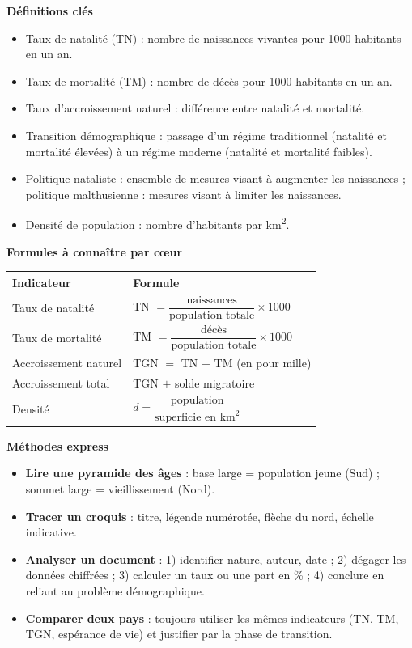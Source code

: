 \documentclass[11pt]{article}
\newcommand{\cle}[1]{{\popxbold\color{popdark}#1}}
\begin{document}
\begin{bilan}
\textbf{Définitions clés}
\begin{itemize}
  \item \cle{Taux de natalité} (TN) : nombre de naissances vivantes pour 1000 habitants en un an.
  \item \cle{Taux de mortalité} (TM) : nombre de décès pour 1000 habitants en un an.
  \item \cle{Taux d'accroissement naturel} : différence entre natalité et mortalité.
  \item \cle{Transition démographique} : passage d'un régime traditionnel (natalité et mortalité élevées) à un régime moderne (natalité et mortalité faibles).
  \item \cle{Politique nataliste} : ensemble de mesures visant à augmenter les naissances ; \cle{politique malthusienne} : mesures visant à limiter les naissances.
  \item \cle{Densité de population} : nombre d'habitants par km\textsuperscript{2}.
\end{itemize}

\textbf{Formules à connaître par c\oe ur}
\begin{center}
\begin{tabularx}{\linewidth}{|l|X|}\hline
\rowcolor{popblueL} \textbf{Indicateur} & \textbf{Formule} \\ \hline
Taux de natalité & TN $= \dfrac{\text{naissances}}{\text{population totale}} \times 1000$ \\ \hline
Taux de mortalité & TM $= \dfrac{\text{décès}}{\text{population totale}} \times 1000$ \\ \hline
Accroissement naturel & TGN $=$ TN $-$ TM (en pour mille) \\ \hline
Accroissement total & TGN $+$ solde migratoire \\ \hline
Densité & $d = \dfrac{\text{population}}{\text{superficie en km}^2}$ \\ \hline
\end{tabularx}
\end{center}

\textbf{Méthodes express}
\begin{itemize}
  \item \textbf{Lire une pyramide des âges} : base large = population jeune (Sud) ; sommet large = vieillissement (Nord).
  \item \textbf{Tracer un croquis} : titre, légende numérotée, flèche du nord, échelle indicative.
  \item \textbf{Analyser un document} : 1) identifier nature, auteur, date ; 2) dégager les données chiffrées ; 3) calculer un taux ou une part en \% ; 4) conclure en reliant au problème démographique.
  \item \textbf{Comparer deux pays} : toujours utiliser les mêmes indicateurs (TN, TM, TGN, espérance de vie) et justifier par la phase de transition.
\end{itemize}
\end{bilan}
\end{document}
